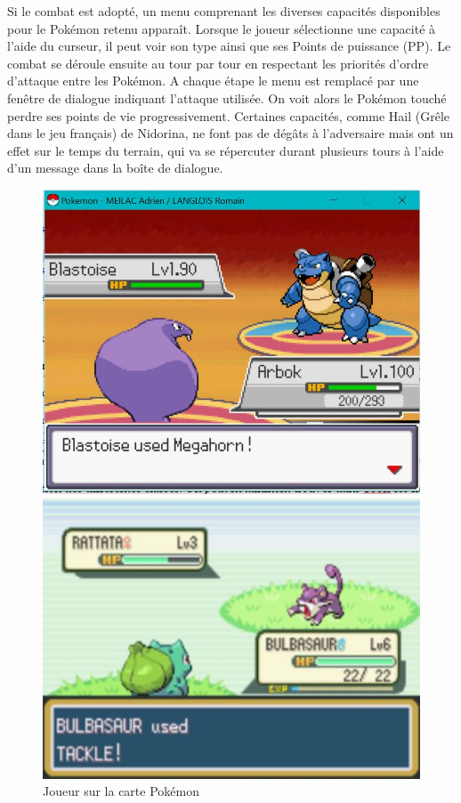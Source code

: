 Si le combat est adopté, un menu comprenant les diverses capacités disponibles pour le Pokémon retenu apparaît. Lorsque le joueur sélectionne une capacité à l'aide du curseur, il peut voir son type ainsi que ses Points de puissance (PP). Le combat se déroule ensuite au tour par tour en respectant les priorités d'ordre d'attaque entre les Pokémon. A chaque étape le menu est remplacé par une fenêtre de dialogue indiquant l'attaque utilisée. On voit alors le Pokémon touché perdre ses points de vie progressivement. Certaines capacités, comme Hail (Grêle dans le jeu français) de Nidorina, ne font pas de dégâts à l'adversaire mais ont un effet sur le temps du terrain, qui va se répercuter durant plusieurs tours à l'aide d'un message dans la boîte de dialogue.

\begin{figure}[!h]
\begin{minipage}{0.49\textwidth}
\includegraphics[scale = 0.6]{../Images/useMove.jpg}
\end{minipage}
\begin{minipage}{0.49\textwidth}
\includegraphics[scale = 0.84]{../Images/vrai_jeu_useMove.jpg}
\end{minipage}
\caption{Joueur sur la carte Pokémon}
\end{figure}

